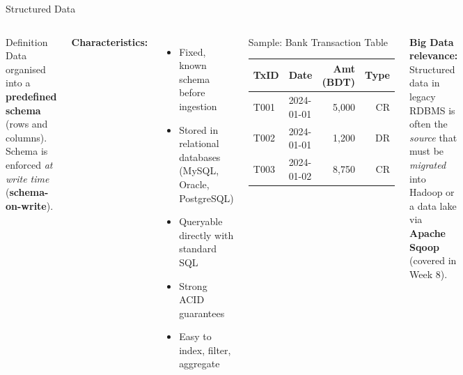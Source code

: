 \documentclass[aspectratio=169,10pt]{beamer}
\begin{document}
\begin{frame}{Structured Data}
  \begin{columns}[T]
      \begin{block}{Definition}
        Data organised into a \textbf{predefined schema} (rows and columns).  Schema is enforced \emph{at write time} (\textbf{schema-on-write}).
      \end{block}
      \vspace{4pt}
      \textbf{Characteristics:}
      \begin{itemize}
        \item Fixed, known schema before ingestion
        \item Stored in relational databases (MySQL, Oracle, PostgreSQL)
        \item Queryable directly with standard SQL
        \item Strong ACID guarantees
        \item Easy to index, filter, aggregate
      \end{itemize}

      \begin{block}{Sample: Bank Transaction Table}
        \small
        \renewcommand{\arraystretch}{1.15}
        \begin{tabular}{llrr}
          \toprule
          \textbf{TxID} & \textbf{Date} & \textbf{Amt (BDT)} & \textbf{Type} \\
          \midrule
          T001 & 2024-01-01 & 5{,}000 & CR \\
          T002 & 2024-01-01 & 1{,}200 & DR \\
          T003 & 2024-01-02 & 8{,}750 & CR \\
          \bottomrule
        \end{tabular}
      \end{block}
      \vspace{6pt}
      \textbf{Big Data relevance:}\\[3pt]
      \small Structured data in legacy RDBMS is often the \emph{source} that must be \emph{migrated} into Hadoop or a data lake via \textbf{Apache Sqoop} (covered in Week 8).
  \end{columns}
\end{frame}
\end{document}
